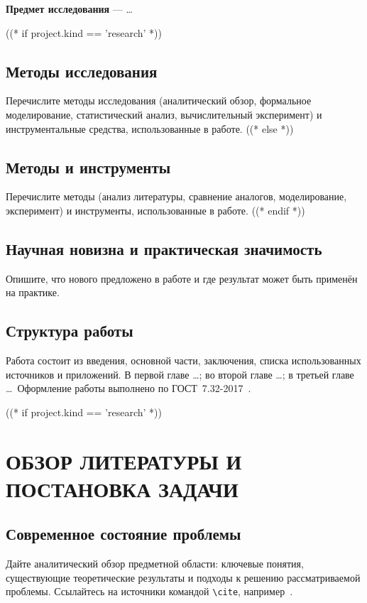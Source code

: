 \documentclass[12pt,a4paper]{extreport}
\begin{document}
\textbf{Предмет исследования} — \ldots

((* if project.kind == 'research' *))
\section*{Методы исследования}
Перечислите методы исследования (аналитический обзор, формальное
моделирование, статистический анализ, вычислительный эксперимент) и
инструментальные средства, использованные в работе.
((* else *))
\section*{Методы и инструменты}
Перечислите методы (анализ литературы, сравнение аналогов,
моделирование, эксперимент) и инструменты, использованные в работе.
((* endif *))

\section*{Научная новизна и практическая значимость}
Опишите, что нового предложено в работе и где результат может быть
применён на практике.

\section*{Структура работы}
Работа состоит из введения, основной части, заключения, списка
использованных источников и приложений. В первой главе \ldots; во
второй главе \ldots; в третьей главе \ldots\ Оформление работы
выполнено по ГОСТ~7.32-2017~\cite{gost732}.

\clearpage

((* if project.kind == 'research' *))
\chapter{ОБЗОР ЛИТЕРАТУРЫ И ПОСТАНОВКА ЗАДАЧИ}

\section{Современное состояние проблемы}
Дайте аналитический обзор предметной области: ключевые понятия,
существующие теоретические результаты и подходы к решению
рассматриваемой проблемы. Ссылайтесь на источники командой
\verb|\cite|, например~\cite{article}.
\end{document}
